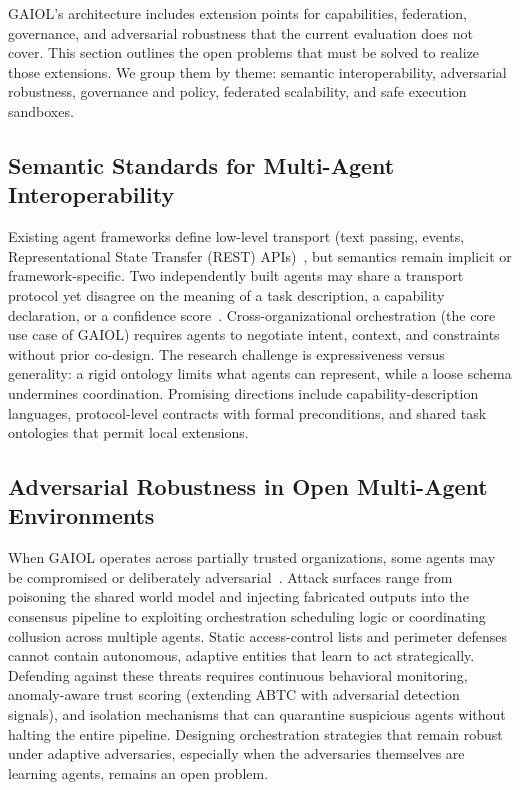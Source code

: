 \documentclass{iopjournal}
\begin{document}
GAIOL's architecture includes extension points for capabilities, federation, governance, and adversarial robustness that the current evaluation does not cover. This section outlines the open problems that must be solved to realize those extensions. We group them by theme: semantic interoperability, adversarial robustness, governance and policy, federated scalability, and safe execution sandboxes.

\subsection{Semantic Standards for Multi-Agent Interoperability}

Existing agent frameworks define low-level transport (text passing, events, Representational State Transfer (REST) APIs)~\cite{AutoGen, CAMEL, MetaGPT}, but semantics remain implicit or framework-specific. Two independently built agents may share a transport protocol yet disagree on the meaning of a task description, a capability declaration, or a confidence score~\cite{LLM_MAS_Survey}. Cross-organizational orchestration (the core use case of GAIOL) requires agents to negotiate intent, context, and constraints without prior co-design. The research challenge is expressiveness versus generality: a rigid ontology limits what agents can represent, while a loose schema undermines coordination. Promising directions include capability-description languages, protocol-level contracts with formal preconditions, and shared task ontologies that permit local extensions.

\subsection{Adversarial Robustness in Open Multi-Agent Environments}

When GAIOL operates across partially trusted organizations, some agents may be compromised or deliberately adversarial~\cite{Weidinger, RedTeaming}. Attack surfaces range from poisoning the shared world model and injecting fabricated outputs into the consensus pipeline to exploiting orchestration scheduling logic or coordinating collusion across multiple agents. Static access-control lists and perimeter defenses cannot contain autonomous, adaptive entities that learn to act strategically. Defending against these threats requires continuous behavioral monitoring, anomaly-aware trust scoring (extending ABTC with adversarial detection signals), and isolation mechanisms that can quarantine suspicious agents without halting the entire pipeline. Designing orchestration strategies that remain robust under adaptive adversaries, especially when the adversaries themselves are learning agents, remains an open problem.
\end{document}

